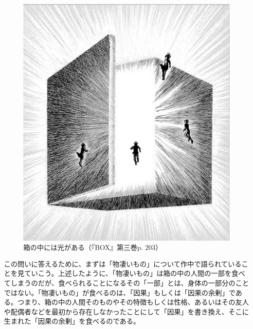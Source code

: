 \documentclass[a4paper]{jsarticle}
\begin{document}
\begin{figure}[h]
\centering
\includegraphics[clip, scale=0.5]{物凄いもの}
\caption{箱の中には光がある（『BOX』第三巻p. 203）}
\end{figure}

この問いに答えるために、まずは「物凄いもの」について作中で語られていることを見ていこう。上述したように、「物凄いもの」は箱の中の人間の一部を食べてしまうのだが、食べられることになるその「一部」とは、身体の一部分のことではない。「物凄いもの」が食べるのは、「因果」もしくは「因果の余剰」である。つまり、箱の中の人間そのものやその特徴もしくは性格、あるいはその友人や配偶者などを最初から存在しなかったことにして「因果」を書き換え、そこに生まれた「因果の余剰」を食べるのである。
\end{document}
